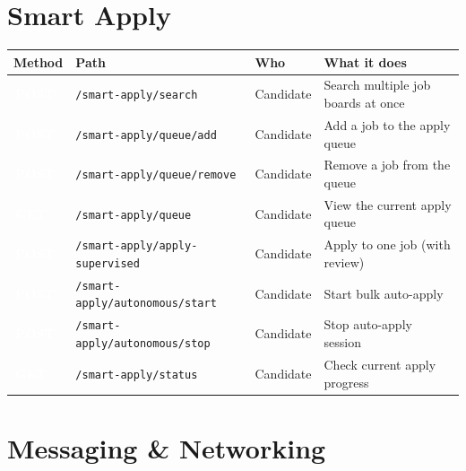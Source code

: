 \documentclass[12pt, a4paper]{report}
\newcommand{\code}[1]{\texttt{\small #1}}
\newcommand{\badge}[2]{%
  \colorbox{#1}{\textcolor{white}{\tiny\bfseries\,#2\,}}%
}
\newcommand{\GET}{\badge{successgr}{GET}}
\newcommand{\POST}{\badge{infoblue}{POST}}
\begin{document}
{%
\section{Smart Apply}

\begin{longtable}{p{1.5cm}p{5.5cm}p{2.2cm}p{5.5cm}}
\toprule
\textbf{Method} & \textbf{Path} & \textbf{Who} & \textbf{What it does} \\
\midrule
\endhead
\POST & \code{/smart-apply/search}             & Candidate & Search multiple job boards at once \\
\POST & \code{/smart-apply/queue/add}          & Candidate & Add a job to the apply queue \\
\POST & \code{/smart-apply/queue/remove}       & Candidate & Remove a job from the queue \\
\GET  & \code{/smart-apply/queue}              & Candidate & View the current apply queue \\
\POST & \code{/smart-apply/apply-supervised}   & Candidate & Apply to one job (with review) \\
\POST & \code{/smart-apply/autonomous/start}   & Candidate & Start bulk auto-apply \\
\POST & \code{/smart-apply/autonomous/stop}    & Candidate & Stop auto-apply session \\
\GET  & \code{/smart-apply/status}             & Candidate & Check current apply progress \\
\bottomrule
\end{longtable}

\section{Messaging \& Networking}

}
\end{document}
